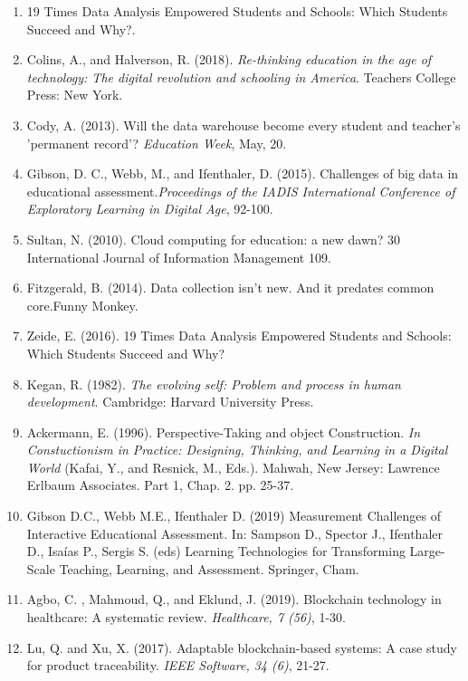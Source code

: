 \documentclass{article}
\begin{document}
\begin{enumerate}
    \label{sec:9}
    \item 19 Times Data Analysis Empowered Students and Schools: Which Students Succeed and Why?.
    \label{sec:10}
    \item Colins, A., and Halverson, R. (2018).\textit{ Re-thinking education in the age of technology: The digital revolution and schooling in America}. Teachers College Press: New York.
    \label{sec:11}
    \item Cody, A. (2013). Will the data warehouse become every student and teacher's 'permanent record'? \textit{Education Week}, May, 20.
    \label{sec:12}
    \item Gibson, D. C., Webb, M., and Ifenthaler, D. (2015). Challenges of big data in educational assessment.\textit{Proceedings of the IADIS International Conference of Exploratory Learning in Digital Age}, 92-100.
    \label{sec:13}
    \item Sultan, N. (2010). Cloud computing for education: a new dawn? 30 International Journal of Information Management  109.
    \label{sec:14}
    \item Fitzgerald, B. (2014). Data collection isn't new. And it predates common core.Funny Monkey.
    \label{sec:15}
    \item Zeide, E. (2016). 19 Times Data Analysis Empowered Students and Schools: Which Students Succeed and Why?
    \item Kegan, R. (1982). \textit{The evolving self: Problem and process in human development}. Cambridge: Harvard University Press.
    \item Ackermann, E. (1996). Perspective-Taking and object Construction. \textit{In Constuctionism in Practice: Designing, Thinking, and Learning in a Digital World} (Kafai, Y., and Resnick, M., Eds.). Mahwah, New Jersey: Lawrence Erlbaum Associates. Part 1, Chap. 2. pp. 25-37.
    \item Gibson D.C., Webb M.E., Ifenthaler D. (2019) Measurement Challenges of Interactive Educational Assessment. In: Sampson D., Spector J., Ifenthaler D., Isaías P., Sergis S. (eds) Learning Technologies for Transforming Large-Scale Teaching, Learning, and Assessment. Springer, Cham.
    \item Agbo, C. , Mahmoud, Q., and Eklund, J. (2019). Blockchain technology in healthcare: A systematic review. \textit{Healthcare, 7\textit{ (56)}}, 1-30.
    \item Lu, Q. and Xu, X. (2017). Adaptable blockchain-based systems: A case study for product traceability. \textit{IEEE Software, 34\textit{ (6)}}, 21-27.

\end{enumerate}
\end{document}
